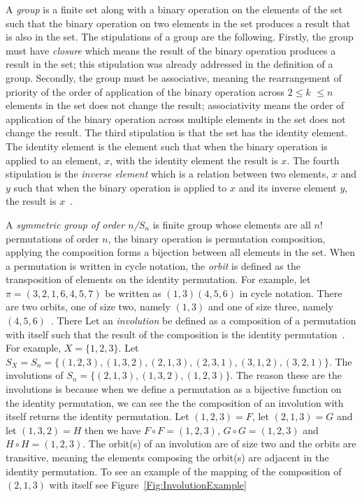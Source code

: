 A \emph{group} is a finite set along with a binary operation on the elements of the set such that the binary operation on two 
elements in the set produces a result that is also in the set. 
The stipulations of a group are the following. Firstly, the group must have \emph{closure} which means the 
result of the binary operation produces a result in the set; this stipulation was already addressed in the definition of a group. 
Secondly, the group must 
be associative, meaning the rearrangement of priority of the order of application of the binary operation across $2 \leq k$ $\leq n$ 
elements in the set 
does not change the result; associativity means the order of application of the binary operation across multiple elements in the set does 
not change the result. The third stipulation 
is that the set has the identity element. 
The identity element is the element such that when the binary operation is applied to an element, $x$, with the identity element
the result is $x$. The fourth stipulation is the \emph{inverse element} 
which is a relation between two elements, $x$ and $y$ such that when the binary operation is applied to $x$ and 
its inverse element $y$, 
the result is $x$~\cite{A14}.\par 

A \emph{symmetric group of order $n$/$S_{n}$} is finite group whose elements are all $n!$ permutations of order $n$, the binary operation 
is permutation composition, applying the composition forms a bijection between all elements in the set. When a permutation is written in 
cycle notation, the \emph{orbit} is defined as the transposition of elements on the identity permutation. For example, 
let $\pi=(3,2,1,6,4,5,7)$ be written as $(1,3)(4,5,6)$ in cycle notation. There are two orbits, one of size two, namely $(1,3)$ and 
one of size three, namely $(4,5,6)$~\cite{A15}. There Let an \emph{involution} 
be defined as a composition of a permutation with itself such that the result of the composition is the identity permutation~\cite{A13}. 
For example, $X=\{1, 2, 3\}$. Let $S_{X} = S_{n} = \{(1,2,3),(1,3,2),(2,1,3),(2,3,1),(3,1,2),(3,2,1)\}$. 
The involutions of $S_{n}=\{(2,1,3),(1,3,2),(1,2,3)\}$.
The reason these are the involutions is because when we define a permutation as a bijective function on the identity permutation, 
we can see the the composition 
of an involution with itself returns the identity permutation. Let $(1,2,3)=F$, let $(2,1,3)=G$ and let $(1,3,2)=H$ 
then we have $F \circ F=(1,2,3)$,
$G \circ G = (1,2,3)$ and 
$H \circ H=(1,2,3)$. The orbit(s) of an involution are of size two and 
the orbits are transitive, meaning the elements composing the orbit(s) are adjacent in the identity permutation.
To see an example of the mapping of the composition of $(2,1,3)$ with itself see Figure~\ref{Fig:InvolutionExample}\newline 


